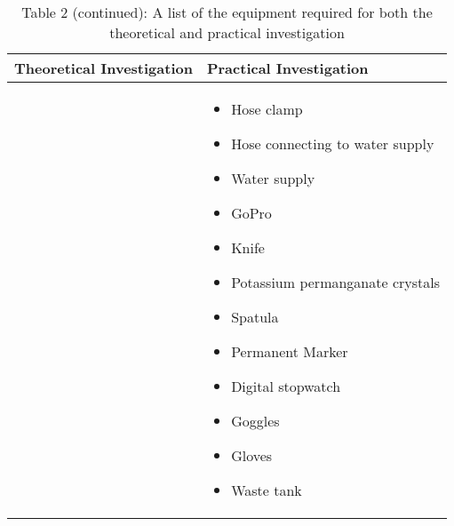 \begin{table}[H]
	\centering
	\renewcommand{\arraystretch}{1.3}
	\begin{tabularx}{\textwidth}{|X|X|}
		\hline
		\textbf{Theoretical Investigation} & \textbf{Practical Investigation} \\
		\hline
		&
		\begin{itemize}[leftmargin=1.5em, itemsep=2pt, topsep=0pt, label=--]
			\item Hose clamp
			\item Hose connecting to water supply
			\item Water supply
			\item GoPro
			\item Knife
			\item Potassium permanganate crystals
			\item Spatula
			\item Permanent Marker
			\item Digital stopwatch
			\item Goggles
			\item Gloves
			\item Waste tank
		\end{itemize} \\
		\hline
	\end{tabularx}
	\caption*{Table 2 (continued): A list of the equipment required for both the theoretical and practical investigation}
	\label{tab:equipmentList2}
\end{table}
